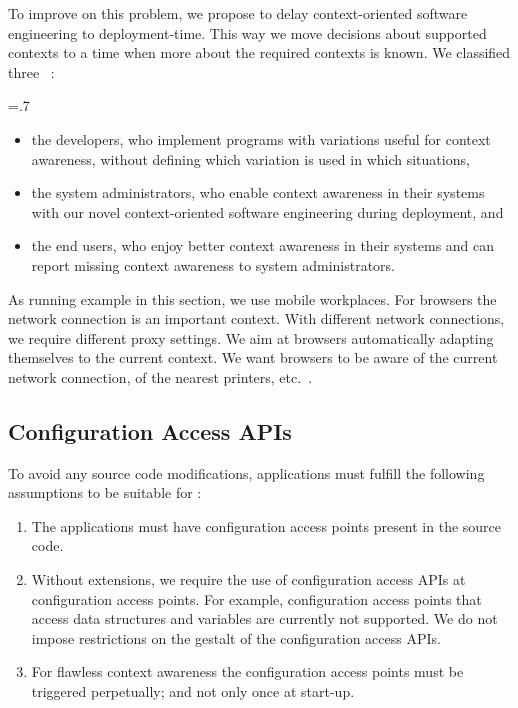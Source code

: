 To improve on this problem, we propose to delay context-oriented software engineering to deployment-time.
This way we move decisions about supported contexts to a time when more about the required contexts is known.
We classified three ~\cite{raab2017introducing}:%
{\parfillskip=0pt \emergencystretch=.7\textwidth \par}
\begin{itemize}
\item the developers, who implement programs with variations useful for context awareness, without defining which variation is used in which situations,
\item the system administrators, who enable context awareness in their systems with our novel context-oriented software engineering during deployment, and
\item the end users, who enjoy better context awareness in their systems and can report missing context awareness to system administrators.
\end{itemize}

As running example in this section, we use mobile workplaces.
For browsers the network connection is an important context.
With different network connections, we require different proxy settings.
We aim at browsers automatically adapting themselves to the current context.
We want browsers to be aware of the current network connection, of the nearest printers, etc.~\cite{raab2016unanticipated}.



\subsection{Configuration Access APIs}

To avoid any source code modifications, applications must fulfill the following assumptions to be suitable for \elektra{}:
\begin{enumerate}
\item The applications must have configuration access points present in the source code.
\item Without extensions, we require the use of configuration access APIs at configuration access points.
For example, configuration access points that access data structures and variables are currently not supported.
We do not impose restrictions on the gestalt of the configuration access APIs.
\item For flawless context awareness the configuration access points must be triggered perpetually;
and not only once at start-up.
\end{enumerate}

